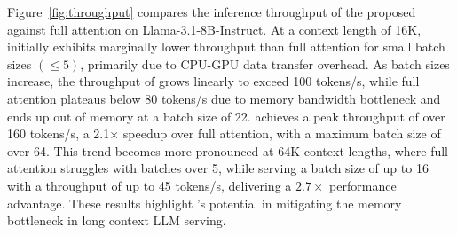 Figure~\ref{fig:throughput} compares the inference throughput of the proposed {\name} against full attention on Llama-3.1-8B-Instruct.
At a context length of 16K, {\name} initially exhibits marginally lower throughput than full attention for small batch sizes \((\leq 5)\), primarily due to CPU-GPU data transfer overhead.
As batch sizes increase, the throughput of {\name} grows linearly to exceed 100 tokens/s, while full attention plateaus below 80 tokens/s due to memory bandwidth bottleneck and ends up out of memory at a batch size of 22.
{\name} achieves a peak throughput of over 160 tokens/s, a 2.1× speedup over full attention, with a maximum batch size of over 64.
This trend becomes more pronounced at 64K context lengths, where full attention struggles with batches over 5, while {\name} serving a batch size of up to 16 with a throughput of up to 45 tokens/s, delivering a \(2.7 \times\) performance advantage.
These results highlight {\name}'s potential in mitigating the memory bottleneck in long context LLM serving.